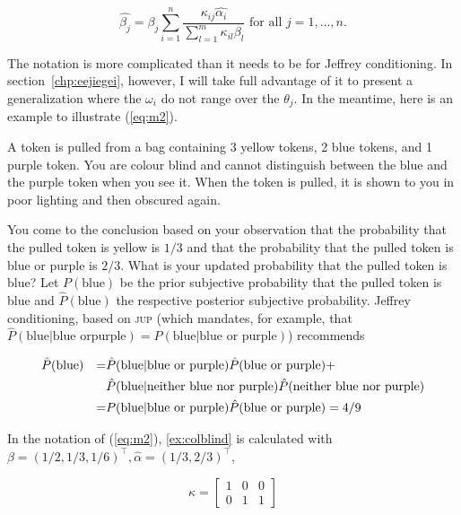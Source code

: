 \documentclass[phd,12pt,oneside]{ubcthesis}
\begin{document}
\begin{equation}
  \label{eq:m2}
  \hat{\beta_{j}}=\beta_{j}\sum_{i=1}^{n}\frac{\kappa_{ij}\hat{\alpha_{i}}}{\sum_{l=1}^{m}\kappa_{il}\beta_{l}}\mbox{ for all }j=1,\ldots,n.
\end{equation}

{\noindent}The notation is more complicated than it needs to be for Jeffrey
conditioning. In section~\ref{chp:eejiegei}, however, I will take
full advantage of it to present a generalization where the
$\omega_{i}$ do not range over the $\theta_{j}$. In the meantime, here
is an example to illustrate (\ref{eq:m2}).

\begin{quotex}
  \label{ex:colblind} A token is pulled from a
  bag containing 3 yellow tokens, 2 blue tokens, and 1 purple token.
  You are colour blind and cannot distinguish between the blue and the
  purple token when you see it. When the token is pulled, it is shown
  to you in poor lighting and then obscured again. 
\end{quotex}

{\noindent}You come to the conclusion based on your observation that
the probability that the pulled token is yellow is $1/3$ and that the
probability that the pulled token is blue or purple is $2/3$. What is
your updated probability that the pulled token is blue? Let
$P(\mbox{blue})$ be the prior subjective probability that the pulled
token is blue and $\hat{P}(\mbox{blue})$ the respective posterior
subjective probability. Jeffrey conditioning, based on \textsc{jup}
(which mandates, for example, that
$\hat{P}(\mbox{blue}|\mbox{blue or}\mbox{
  purple})=P(\mbox{blue}|\mbox{blue or purple})$) recommends

\begin{align}
  \label{eq:jcs}
&\hat{P}(\mbox{blue})&=&\hat{P}(\mbox{blue}|\mbox{blue or purple})\hat{P}(\mbox{blue or
  purple})+\notag \\
&&&\hat{P}(\mbox{blue}|\mbox{neither blue nor
  purple})\hat{P}(\mbox{neither blue nor purple})\notag \\
&&=&P(\mbox{blue}|\mbox{blue or purple})\hat{P}(\mbox{blue or
  purple})=4/9
\end{align}

{\noindent}In the notation of (\ref{eq:m2}), {\xample}
\ref{ex:colblind} is calculated with
$\beta=(1/2,1/3,1/6)^{\top},\hat{\alpha}=(1/3,2/3)^{\top}$,

\begin{equation}
  \label{eq:kappa}
  \kappa=\left[
  \begin{array}{ccc}
    1 & 0 & 0 \\
    0 & 1 & 1
  \end{array}\right]
\end{equation}
\end{document}
